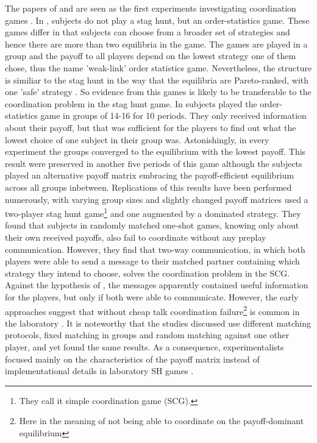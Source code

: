 \documentclass[11pt]{article}
\begin{document}
The papers of \textcite{van_huyck_tacit_1990} and 
\textcite{cooper_communication_1992} are seen as the first experiments 
investigating coordination games \parencite{devetag_when_2007}.
In \textcite{van_huyck_tacit_1990}, subjects do not play a stag
hunt, but an order-statistics game. These games differ in that subjects can
choose from a broader set of strategies and hence there are more than two 
equilibria in the game. The games are played in a group and the payoff to 
all players depend on the lowest strategy one of them chose, thus the name 
'weak-link' order statistics game. Nevertheless, the structure is similiar to
the stag hunt in the way that the equilibria are Pareto-ranked, with one 
'safe' strategy \parencite{devetag_when_2007}.
So evidence from this games is 
likely to be transferable to the coordination problem in the stag hunt game. 
In \textcite{van_huyck_tacit_1990} subjects played the order-statistics 
game in 
groups of 14-16 for 10 periods. They only received information about their 
payoff, but that was sufficient for the players to find out what the 
lowest choice of one subject in 
their group was. Astonishingly, in every experiment the groups converged
to the equilibrium with the lowest payoff. 
This result were preserved in another 
five periods of this game although the subjects played an alternative payoff
matrix embracing the payoff-efficient equilibrium across all groups 
inbetween. 
Replications of this results have been performed numerously, with 
varying group sizes and slightly changed payoff matrices 
\parencite[6]{devetag_when_2007} 
\textcite{cooper_communication_1992} used a
two-player stag hunt game\footnote{They call 
it simple coordination game (SCG).}  
and one augmented by a dominated strategy. They found that 
subjects in randomly matched one-shot games, knowing only about their own
received payoffs, also fail to coordinate without any preplay communication. 
However, they find that two-way communication, in which both players were
able to send a message to their matched partner containing which strategy
they intend to choose, solves the coordination problem in the SCG. 
Against the hypothesis of \textcite{aumann_nash_1990}, the messages
apparently contained useful information for the players, but only if both
were able to communicate.
However, the 
early approaches suggest that without cheap talk 
coordination failure\footnote{Here in the meaning of not being 
able to coordinate on the payoff-dominant equilibrium} 
is common in the laboratory \parencite[2]{devetag_when_2007}. 
It is noteworthy that the studies 
discussed use different matching protocols, fixed matching in groups and 
random matching against one other player, and yet found the same results. 
As a consequence, experimentalists focused mainly on the characteristics 
of the payoff matrix instead of implementational details in laboratory SH 
games \parencite[8]{devetag_when_2007}.
\end{document}
